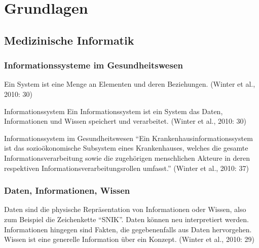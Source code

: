 \chapter{Grundlagen}\label{ch:preliminaries}

\section{Medizinische Informatik}

\subsection{Informationssysteme im Gesundheitswesen}

\begin{definition}[System]
Ein System ist eine Menge an Elementen und deren Beziehungen. (Winter et al., 2010: 30)
\end{definition}

\begin{definition}{Informationssystem}
Ein Informationssystem ist ein System das Daten, Informationen und Wissen speichert und verarbeitet. (Winter et al., 2010: 30)
\end{definition}

\begin{definition}{Informationssystem im Gesundheitswesen}
\enquote{Ein Krankenhausinformationssystem ist das sozioökonomische Subsystem eines Krankenhauses, welches die gesamte Informationsverarbeitung sowie die zugehörigen menschlichen Akteure in deren respektiven Informationsverarbeitungsrollen umfasst.} (Winter et al., 2010: 37)
\end{definition}

\subsection{Daten, Informationen, Wissen}
Daten sind die physische Repräsentation von Informationen oder Wissen, also zum Beispiel die Zeichenkette \enquote{SNIK}. Daten können neu interpretiert werden.
Informationen hingegen sind Fakten, die gegebenenfalls aus Daten hervorgehen.
Wissen ist eine generelle Information über ein Konzept. (Winter et al., 2010: 29)

